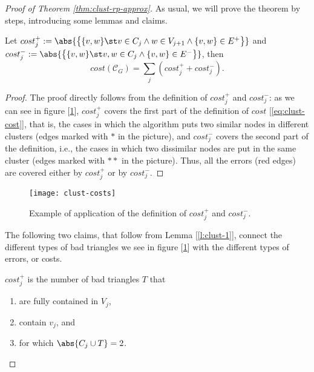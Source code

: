\begin{proof}[Proof of Theorem \ref{thm:clust-rp-approx}]
    As usual, we will prove the theorem by steps, introducing some lemmas and claims.
    
    \begin{lem}\label{l:clust-1}
        Let $cost^+_j := \abs{\big\{ \{v,w\} \st v \in C_j \wedge w \in V_{j+1} \wedge \{v,w\} \in E^+ \big\}}$ and\\ $cost^-_j := \abs{\big\{ \{v,w\} \st v,w \in C_j \wedge \{v,w\} \in E^- \big\}}$, then
        \begin{equation}
            cost(\mathscr{C}_G) = \sum_j \left( cost_j^+ + cost_j^- \right).
        \end{equation}
    \end{lem}
    \begin{proof}
        The proof directly follows from the definition of $cost_j^+$ and $cost_j^-$: as we can see in figure [\ref{fig:clust-costs}], $cost_j^+$ covers the first part of the definition of $cost$ [\ref{eq:clust-cost}], that is, the cases in which the algorithm puts two similar nodes in different clusters (edges marked with $*$ in the picture), and $cost_j^-$ covers the second part of the definition, i.e., the cases in which two dissimilar nodes are put in the same cluster (edges marked with $**$ in the picture). Thus, all the errors (red edges) are covered either by $cost_j^+$ or by $cost_j^-$.
    \end{proof}

    \begin{figure}
        \centering
        \texttt{[image: clust-costs]}
        \caption{Example of application of the definition of $cost_j^+$ and $cost_j^-$.}
        \label{fig:clust-costs}
    \end{figure}

    The following two claims, that follow from Lemma [\ref{l:clust-1}], connect the different types of bad triangles we see in figure [\ref{fig:clust-costs}] with the different types of errors, or costs.
    
    \begin{claim}\label{cl:clust-1}
        $cost_j^+$ is the number of bad triangles $T$ that
        \begin{enumerate}
            \item are fully contained in $V_j$,
            \item contain $v_j$, and
            \item for which $\abs{C_j \cup T} = 2$.
        \end{enumerate}
    \end{claim}


\end{proof}
